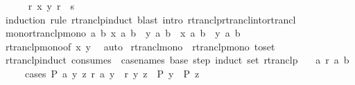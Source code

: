 \begin{isabellebody}
\ \ \ \ \isamarkupfalse%
\ {\isacartoucheopen}r\isactrlsup {\isacharasterisk}{\kern0pt}\isactrlsup {\isacharasterisk}{\kern0pt}\ x\ y{\isacartoucheclose}\ {\isacartoucheopen}r\ {\isasymle}\ s{\isacartoucheclose}\isanewline
\ \ \ \ \isamarkupfalse%
\ {\isacharparenleft}{\kern0pt}induction\ rule{\isacharcolon}{\kern0pt}\ rtranclp{\isachardot}{\kern0pt}induct{\isacharparenright}{\kern0pt}\ {\isacharparenleft}{\kern0pt}blast\ intro{\isacharcolon}{\kern0pt}\ rtranclp{\isachardot}{\kern0pt}rtrancl{\isacharunderscore}{\kern0pt}into{\isacharunderscore}{\kern0pt}rtrancl{\isacharparenright}{\kern0pt}{\isacharplus}{\kern0pt}\isanewline
{}\isamarkupfalse%
%
\endisatagproof
{\isafoldproof}%
%
\isadelimproof
\isanewline
%
\endisadelimproof
\isanewline
{}\isamarkupfalse%
\ mono{\isacharunderscore}{\kern0pt}rtranclp{\isacharbrackleft}{\kern0pt}mono{\isacharbrackright}{\kern0pt}{\isacharcolon}{\kern0pt}\ {\isachardoublequoteopen}{\isacharparenleft}{\kern0pt}{\isasymAnd}a\ b{\isachardot}{\kern0pt}\ x\ a\ b\ {\isasymlongrightarrow}\ y\ a\ b{\isacharparenright}{\kern0pt}\ {\isasymLongrightarrow}\ x\isactrlsup {\isacharasterisk}{\kern0pt}\isactrlsup {\isacharasterisk}{\kern0pt}\ a\ b\ {\isasymlongrightarrow}\ y\isactrlsup {\isacharasterisk}{\kern0pt}\isactrlsup {\isacharasterisk}{\kern0pt}\ a\ b{\isachardoublequoteclose}\isanewline
%
\isadelimproof
\ \ \ %
\endisadelimproof
%
\isatagproof
{}\isamarkupfalse%
\ rtranclp{\isacharunderscore}{\kern0pt}mono{\isacharbrackleft}{\kern0pt}of\ x\ y{\isacharbrackright}{\kern0pt}\ \isamarkupfalse%
\ auto%
\endisatagproof
{\isafoldproof}%
%
\isadelimproof
\isanewline
%
\endisadelimproof
\isanewline
{}\isamarkupfalse%
\ rtrancl{\isacharunderscore}{\kern0pt}mono\ {\isacharequal}{\kern0pt}\ rtranclp{\isacharunderscore}{\kern0pt}mono\ {\isacharbrackleft}{\kern0pt}to{\isacharunderscore}{\kern0pt}set{\isacharbrackright}{\kern0pt}\isanewline
\isanewline
{}\isamarkupfalse%
\ rtranclp{\isacharunderscore}{\kern0pt}induct\ {\isacharbrackleft}{\kern0pt}consumes\ {}{\isacharcomma}{\kern0pt}\ case{\isacharunderscore}{\kern0pt}names\ base\ step{\isacharcomma}{\kern0pt}\ induct\ set{\isacharcolon}{\kern0pt}\ rtranclp{\isacharbrackright}{\kern0pt}{\isacharcolon}{\kern0pt}\isanewline
\ \ \ a{\isacharcolon}{\kern0pt}\ {\isachardoublequoteopen}r\isactrlsup {\isacharasterisk}{\kern0pt}\isactrlsup {\isacharasterisk}{\kern0pt}\ a\ b{\isachardoublequoteclose}\isanewline
\ \ \ \ \ cases{\isacharcolon}{\kern0pt}\ {\isachardoublequoteopen}P\ a{\isachardoublequoteclose}\ {\isachardoublequoteopen}{\isasymAnd}y\ z{\isachardot}{\kern0pt}\ r\isactrlsup {\isacharasterisk}{\kern0pt}\isactrlsup {\isacharasterisk}{\kern0pt}\ a\ y\ {\isasymLongrightarrow}\ r\ y\ z\ {\isasymLongrightarrow}\ P\ y\ {\isasymLongrightarrow}\ P\ z{\isachardoublequoteclose}\isanewline

\end{isabellebody}

